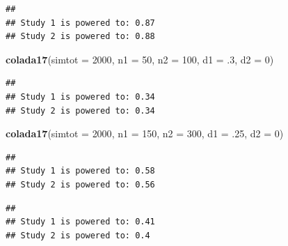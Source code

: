 \documentclass[]{book}
\newenvironment{Shaded}{\begin{snugshade}}{\end{snugshade}}
\newcommand{\CommentTok}[1]{\textcolor[rgb]{0.56,0.35,0.01}{\textit{#1}}}
\newcommand{\DataTypeTok}[1]{\textcolor[rgb]{0.13,0.29,0.53}{#1}}
\newcommand{\DecValTok}[1]{\textcolor[rgb]{0.00,0.00,0.81}{#1}}
\newcommand{\FloatTok}[1]{\textcolor[rgb]{0.00,0.00,0.81}{#1}}
\newcommand{\KeywordTok}[1]{\textcolor[rgb]{0.13,0.29,0.53}{\textbf{#1}}}
\newcommand{\NormalTok}[1]{#1}
\newcommand{\OperatorTok}[1]{\textcolor[rgb]{0.81,0.36,0.00}{\textbf{#1}}}
\newcommand{\StringTok}[1]{\textcolor[rgb]{0.31,0.60,0.02}{#1}}
\begin{document}
\begin{verbatim}
## 
## Study 1 is powered to: 0.87
## Study 2 is powered to: 0.88
\end{verbatim}

\begin{Shaded}
\begin{Highlighting}[]
  \KeywordTok{colada17}\NormalTok{(}\DataTypeTok{simtot =} \DecValTok{2000}\NormalTok{, }\DataTypeTok{n1 =} \DecValTok{50}\NormalTok{, }\DataTypeTok{n2 =} \DecValTok{100}\NormalTok{, }\DataTypeTok{d1 =} \FloatTok{.3}\NormalTok{, }\DataTypeTok{d2 =} \DecValTok{0}\NormalTok{)}
\end{Highlighting}
\end{Shaded}

\begin{verbatim}
## 
## Study 1 is powered to: 0.34
## Study 2 is powered to: 0.34
\end{verbatim}

\begin{Shaded}
\begin{Highlighting}[]
  \KeywordTok{colada17}\NormalTok{(}\DataTypeTok{simtot =} \DecValTok{2000}\NormalTok{, }\DataTypeTok{n1 =} \DecValTok{150}\NormalTok{, }\DataTypeTok{n2 =} \DecValTok{300}\NormalTok{, }\DataTypeTok{d1 =} \FloatTok{.25}\NormalTok{, }\DataTypeTok{d2 =} \DecValTok{0}\NormalTok{)}
\end{Highlighting}
\end{Shaded}

\begin{verbatim}
## 
## Study 1 is powered to: 0.58
## Study 2 is powered to: 0.56
\end{verbatim}

\begin{Shaded}
\end{Shaded}

\begin{verbatim}
## 
## Study 1 is powered to: 0.41
## Study 2 is powered to: 0.4
\end{verbatim}
\end{document}
